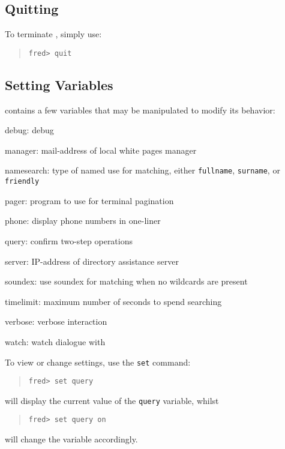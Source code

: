 \subsection	{Quitting}
To terminate ,
simply use:
\begin{quote}\small\begin{verbatim}
fred> quit
\end{verbatim}\end{quote}

\subsection	{Setting Variables}\label{setting:variables}
 contains a few variables that may be manipulated to modify its
behavior: 
\begin{describe}
\item[debug:]	debug 

\item[manager:]	mail-address of local white pages manager

\item[namesearch:] type of named use for matching,
		either \verb"fullname", \verb"surname", or \verb"friendly"

\item[pager:]	program to use for terminal pagination

\item[phone:]	display phone numbers in one-liner

\item[query:]	confirm two-step operations

\item[server:]	IP-address of directory assistance server

\item[soundex:]	use soundex for matching when no wildcards are present

\item[timelimit:]	maximum number of seconds to spend searching

\item[verbose:]	verbose interaction

\item[watch:]	watch dialogue with 
\end{describe}
To view or change settings, use the \verb"set" command:
\begin{quote}\small\begin{verbatim}
fred> set query
\end{verbatim}\end{quote}
will display the current value of the \verb"query" variable,
whilst
\begin{quote}\small\begin{verbatim}
fred> set query on
\end{verbatim}\end{quote}
will change the variable accordingly.

